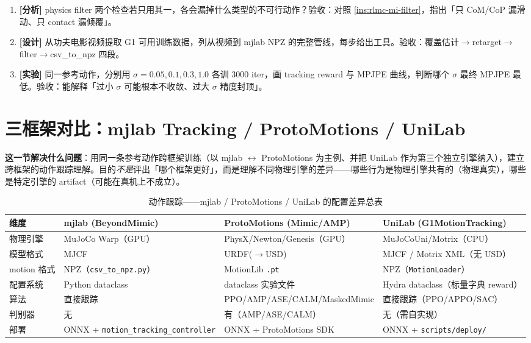 \begin{practice}[本节练习]
\begin{enumerate}
  \item \textbf{[分析]} physics filter 两个检查若只用其一，各会漏掉什么类型的不可行动作？验收：对照 \cref{ins:rlmc-mi-filter}，指出「只 CoM/CoP 漏滑动、只 contact 漏倾覆」。
  \item \textbf{[设计]} 从功夫电影视频提取 G1 可用训练数据，列从视频到 mjlab NPZ 的完整管线，每步给出工具。验收：覆盖估计$\to$retarget$\to$filter$\to$csv\_to\_npz 四段。
  \item \textbf{[实验]} 同一参考动作，分别用 $\sigma=0.05,0.1,0.3,1.0$ 各训 3000 iter，画 tracking reward 与 MPJPE 曲线，判断哪个 $\sigma$ 最终 MPJPE 最低。验收：能解释「过小 $\sigma$ 可能根本不收敛、过大 $\sigma$ 精度封顶」。
\end{enumerate}
\end{practice}

\section{三框架对比：mjlab Tracking / ProtoMotions / UniLab}
\label{sec:rlmc-mi-compare}

\textbf{这一节解决什么问题}：用同一条参考动作跨框架训练（以 mjlab $\leftrightarrow$ ProtoMotions 为主例、并把 UniLab 作为第三个独立引擎纳入），建立跨框架的动作跟踪理解。目的\emph{不是}评出「哪个框架更好」，而是理解不同物理引擎的差异——哪些行为是物理引擎共有的（物理真实），哪些是特定引擎的 artifact（可能在真机上不成立）。

\begin{table}[ht]
\centering
\small
\caption{动作跟踪——mjlab / ProtoMotions / UniLab 的配置差异总表}
\label{tab:rlmc-mi-cfgdiff}
\begin{tabular}{@{}p{1.9cm}p{3.0cm}p{4.0cm}p{3.6cm}@{}}
\toprule
维度 & mjlab (BeyondMimic) & ProtoMotions (Mimic/AMP) & UniLab (G1MotionTracking) \\
\midrule
物理引擎 & MuJoCo Warp（GPU） & PhysX/Newton/Genesis（GPU） & MuJoCoUni/Motrix（CPU） \\
模型格式 & MJCF & URDF($\to$USD) & MJCF / Motrix XML（无 USD） \\
motion 格式 & NPZ（\verb|csv_to_npz.py|） & MotionLib \verb|.pt| & NPZ（\verb|MotionLoader|） \\
配置系统 & Python dataclass & dataclass 实验文件 & Hydra dataclass（标量字典 reward） \\
算法 & 直接跟踪 & PPO/AMP/ASE/CALM/MaskedMimic & 直接跟踪（PPO/APPO/SAC） \\
判别器 & 无 & 有（AMP/ASE/CALM） & 无（需自实现） \\
部署 & ONNX + \verb|motion_tracking_controller| & ONNX + ProtoMotions SDK & ONNX + \verb|scripts/deploy/| \\
\bottomrule
\end{tabular}
\end{table}

